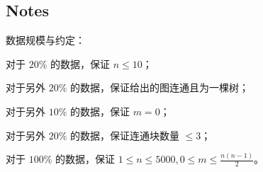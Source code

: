 \documentclass[11pt,a4paper]{article}
\begin{document}
\begin{spacing}{1.25}
		\subsection{Notes}

		数据规模与约定：

		对于 $20\%$ 的数据，保证 $n\leq 10$；

		对于另外 $20\%$ 的数据，保证给出的图连通且为一棵树；

		对于另外 $10\%$ 的数据，保证 $m=0$；

		对于另外 $20\%$ 的数据，保证连通块数量 $\leqslant 3$；

		对于 $100\%$ 的数据，保证 $\displaystyle 1\leq n\leq 5000,0\leqslant m\leqslant \frac{n(n-1)}{2}$。
	\newpage
		
\end{spacing}
\end{document}
